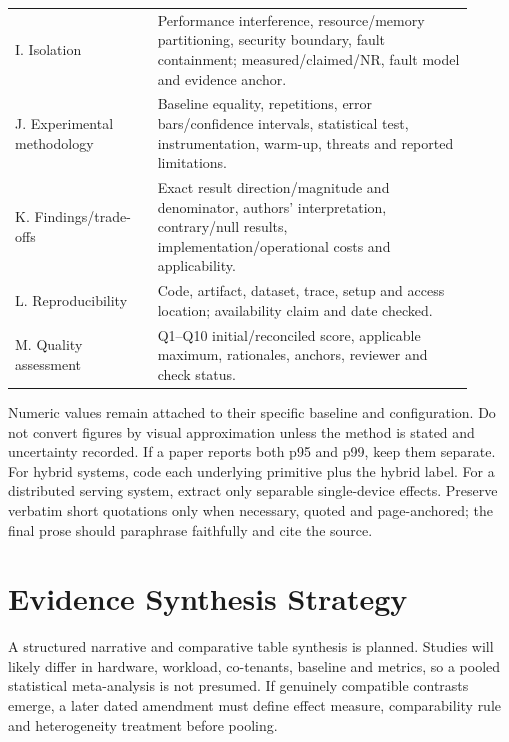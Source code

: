 \documentclass[12pt,a4paper]{article}
\begin{document}
\begin{longtable}{p{0.29\linewidth}p{0.62\linewidth}}
I. Isolation & Performance interference, resource/memory partitioning, security boundary, fault containment; measured/claimed/NR, fault model and evidence anchor.\\
J. Experimental methodology & Baseline equality, repetitions, error bars/confidence intervals, statistical test, instrumentation, warm-up, threats and reported limitations.\\
K. Findings/trade-offs & Exact result direction/magnitude and denominator, authors' interpretation, contrary/null results, implementation/operational costs and applicability.\\
L. Reproducibility & Code, artifact, dataset, trace, setup and access location; availability claim and date checked.\\
M. Quality assessment & Q1--Q10 initial/reconciled score, applicable maximum, rationales, anchors, reviewer and check status.\\\bottomrule
\end{longtable}

Numeric values remain attached to their specific baseline and configuration. Do not convert figures by visual approximation unless the method is stated and uncertainty recorded. If a paper reports both p95 and p99, keep them separate. For hybrid systems, code each underlying primitive plus the hybrid label. For a distributed serving system, extract only separable single-device effects. Preserve verbatim short quotations only when necessary, quoted and page-anchored; the final prose should paraphrase faithfully and cite the source.

\section{Evidence Synthesis Strategy}
A structured narrative and comparative table synthesis is planned. Studies will likely differ in hardware, workload, co-tenants, baseline and metrics, so a pooled statistical meta-analysis is not presumed. If genuinely compatible contrasts emerge, a later dated amendment must define effect measure, comparability rule and heterogeneity treatment before pooling.
\end{document}
